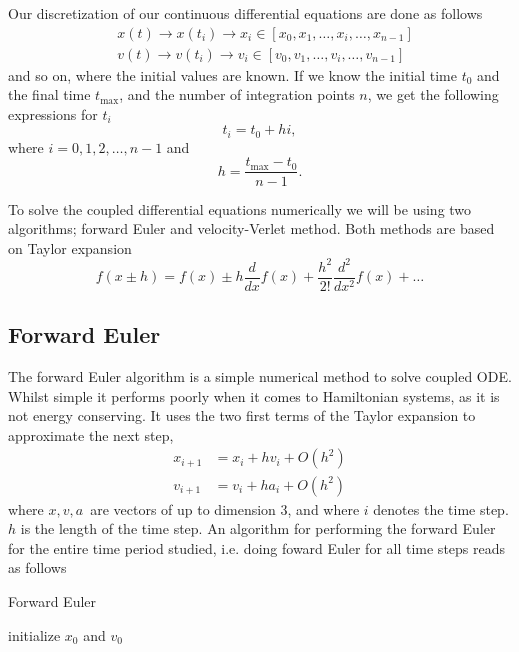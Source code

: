 \documentclass[%
reprint,
nofootinbib,
amsmath,amssymb,
aps,
]{revtex4-1}
\begin{document}
Our discretization of our continuous differential equations are done as follows
\begin{equation}
	\begin{split}
		&x(t) \rightarrow x(t_i) \rightarrow x_i \in [x_0, x_1, \dots, x_i, \dots, x_{n-1}]\\
		&v(t) \rightarrow v(t_i) \rightarrow v_i \in [v_0, v_1, \dots, v_i, \dots, v_{n-1}]
	\end{split}
\end{equation}
and so on, where the initial values are known. If we know the initial time $t_0$ and the final time $t_{\text{max}}$, and the number of integration points $n$, we get the following expressions for $t_i$ 
\begin{equation}
	t_i = t_0 + hi,
\end{equation}
where $i = 0,1,2,\dots,n-1$ and 
\begin{equation}
	h = \frac{t_{\text{max}} - t_0}{n-1}.
\end{equation}

To solve the coupled differential equations numerically we will be using two algorithms; forward Euler and velocity-Verlet method. Both methods are based on Taylor expansion 
\begin{equation}
	f(x\pm h) = f(x) \pm h\frac{d}{dx}f(x) + \frac{h^2}{2!}\frac{d^2}{dx^2}f(x) + \dots 
\end{equation}
\subsection{Forward Euler}
The forward Euler algorithm is a simple numerical method to solve coupled ODE. Whilst simple it performs poorly when it comes to Hamiltonian systems, as it is not energy conserving. It uses the two first terms of the Taylor expansion to approximate the next step,
\begin{align}
	x_{i+1} &= x_i + hv_i + O(h^2)\\
	v_{i+1} &= v_i + ha_i + O(h^2)
\end{align}
where $x,v,a$ are vectors of up to dimension 3, and where $i$ denotes the time step. $h$ is the length of the time step. An algorithm for performing the forward Euler for the entire time period studied, i.e. doing foward Euler for all time steps reads as follows
\begin{algorithm}[H]\label{algo:FE}
	\SetAlgoLined
	\caption{Forward Euler}
	initialize $x_0$ and $v_0$\;
\end{algorithm}
\end{document}
